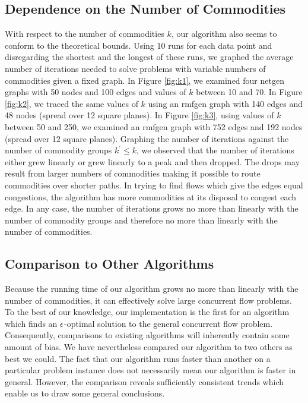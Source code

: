 \subsection{Dependence on the Number of Commodities}
With respect to the number of commodities $k$, our algorithm also seems to
conform to the theoretical bounds.
Using 10 runs for each data point and
disregarding the shortest and the longest of these runs,
we graphed the average number of iterations needed to solve problems
with variable numbers of commodities given a fixed graph.
In Figure \ref{fig:k1}, we examined four {\sc netgen}
graphs with 50 nodes and 100 edges and values of $k$ between 10 and 70.
In Figure \ref{fig:k2}, we traced the same values of $k$ using 
an {\sc rmfgen} graph with 140 edges and 48 nodes (spread over 
12 square planes).
In Figure \ref{fig:k3}, using  values of $k$ between 50 and 250, we examined 
an {\sc rmfgen} graph with 752 edges and 192 nodes (spread over 12 square
planes).
Graphing the number of iterations against the number of commodity groups
$k^\prime \leq k$, 
we observed that the number of iterations either grew linearly or grew
linearly to a peak and then dropped.
The drops may result from larger numbers of commodities making it possible
to route commodities over shorter paths.
In trying to find flows which give the edges equal congestions,
the algorithm has more commodities at its disposal to congest each edge.
In any case, the number of iterations grows no more than linearly with
the number of commodity groups and therefore no more than linearly with
the number of commodities.

\subsection{Comparison to Other Algorithms}
Because the running time of our algorithm grows no more than linearly
with the number of commodities, 
it can effectively solve large concurrent flow problems.
To the best of our knowledge, 
our implementation is the first for an algorithm which
finds an $\epsilon$-optimal solution to the general concurrent flow problem.
Consequently, comparisons to existing algorithms will inherently contain
some amount of bias.
We have nevertheless compared our algorithm to two others  as best we could.  
The fact that our algorithm runs faster than another on a particular
problem instance does not necessarily mean our algorithm is faster in general.
However, the comparison reveals sufficiently consistent trends which
enable us to draw some general conclusions.

